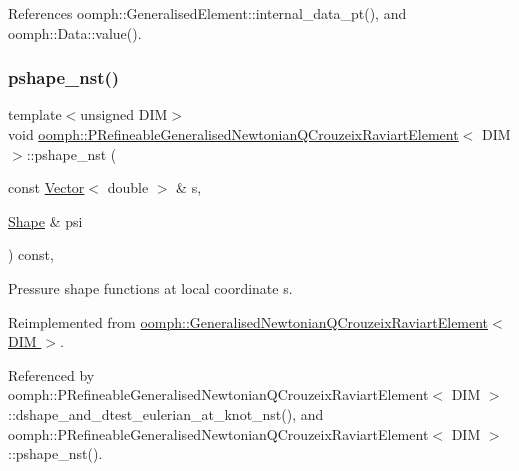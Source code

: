 References oomph\+::\+Generalised\+Element\+::internal\+\_\+data\+\_\+pt(), and oomph\+::\+Data\+::value().

\mbox{\label{classoomph_1_1PRefineableGeneralisedNewtonianQCrouzeixRaviartElement_a08a69865335d8b43be653b21a4ca358f}} 
\subsubsection{\texorpdfstring{pshape\+\_\+nst()}{pshape\_nst()}\hspace{0.1cm}{\footnotesize\ttfamily [1/6]}}
{\footnotesize\ttfamily template$<$unsigned D\+IM$>$ \\
void \hyperlink{classoomph_1_1PRefineableGeneralisedNewtonianQCrouzeixRaviartElement}{oomph\+::\+P\+Refineable\+Generalised\+Newtonian\+Q\+Crouzeix\+Raviart\+Element}$<$ D\+IM $>$\+::pshape\+\_\+nst (\begin{DoxyParamCaption}\item[{const \hyperlink{classoomph_1_1Vector}{Vector}$<$ double $>$ \&}]{s,  }\item[{\hyperlink{classoomph_1_1Shape}{Shape} \&}]{psi }\end{DoxyParamCaption}) const\hspace{0.3cm}{\ttfamily [inline]}, {\ttfamily [virtual]}}



Pressure shape functions at local coordinate s. 



Reimplemented from \hyperlink{classoomph_1_1GeneralisedNewtonianQCrouzeixRaviartElement_ac67f51cf0d592e011ea165f62ff8976e}{oomph\+::\+Generalised\+Newtonian\+Q\+Crouzeix\+Raviart\+Element$<$ D\+I\+M $>$}.



Referenced by oomph\+::\+P\+Refineable\+Generalised\+Newtonian\+Q\+Crouzeix\+Raviart\+Element$<$ D\+I\+M $>$\+::dshape\+\_\+and\+\_\+dtest\+\_\+eulerian\+\_\+at\+\_\+knot\+\_\+nst(), and oomph\+::\+P\+Refineable\+Generalised\+Newtonian\+Q\+Crouzeix\+Raviart\+Element$<$ D\+I\+M $>$\+::pshape\+\_\+nst().

